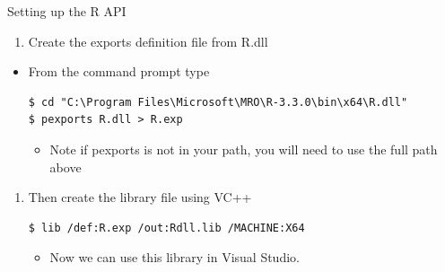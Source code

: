 \documentclass[ignorenonframetext,]{beamer}
\providecommand{\tightlist}{%
\setlength{\itemsep}{0pt}\setlength{\parskip}{0pt}}
\begin{document}
\begin{frame}[fragile]{Setting up the R API}

\begin{enumerate}
\def\labelenumi{\arabic{enumi}.}
\tightlist
\item
  Create the exports definition file from R.dll
\end{enumerate}

\begin{itemize}
\item
  From the command prompt type

\begin{verbatim}
$ cd "C:\Program Files\Microsoft\MRO\R-3.3.0\bin\x64\R.dll"
$ pexports R.dll > R.exp
\end{verbatim}

  \begin{itemize}
  \tightlist
  \item
    Note if pexports is not in your path, you will need to use the full
    path above
  \end{itemize}
\end{itemize}

\begin{enumerate}
\def\labelenumi{\arabic{enumi}.}
\setcounter{enumi}{1}
\item
  Then create the library file using VC++

\begin{verbatim}
$ lib /def:R.exp /out:Rdll.lib /MACHINE:X64
\end{verbatim}

  \begin{itemize}
  \tightlist
  \item
    Now we can use this library in Visual Studio.
  \end{itemize}
\end{enumerate}

\end{frame}
\end{document}
